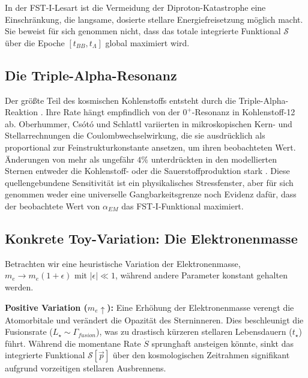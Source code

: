 \documentclass[12pt,a4paper]{article}
\theoremstyle{remark}
\begin{document}
In der FST-I-Lesart ist die Vermeidung der Diproton-Katastrophe eine Einschr\"ankung, die langsame, dosierte stellare Energiefreisetzung m\"oglich macht. Sie beweist f\"ur sich genommen nicht, dass das totale integrierte Funktional $\mathcal{S}$ \"uber die Epoche $[t_{BB}, t_\Lambda]$ global maximiert wird.

\subsection{Die Triple-Alpha-Resonanz}

Der gr\"o\ss{}te Teil des kosmischen Kohlenstoffs entsteht durch die Triple-Alpha-Reaktion \citep{Adams2019,Oberhummer2000}. Ihre Rate h\"angt empfindlich von der $0^+$-Resonanz in Kohlenstoff-12 ab. Oberhummer, Cs\'ot\'o und Schlattl variierten in mikroskopischen Kern- und Stellarrechnungen die Coulombwechselwirkung, die sie ausdr\"ucklich als proportional zur Feinstrukturkonstante ansetzen, um ihren beobachteten Wert. \"Anderungen von mehr als ungef\"ahr $4\%$ unterdr\"uckten in den modellierten Sternen entweder die Kohlenstoff- oder die Sauerstoffproduktion stark \citep{Oberhummer2000}. Diese quellengebundene Sensitivit\"at ist ein physikalisches Stressfenster, aber f\"ur sich genommen weder eine universelle Gangbarkeitsgrenze noch Evidenz daf\"ur, dass der beobachtete Wert von $\alpha_{EM}$ das FST-I-Funktional maximiert.

\subsection{Konkrete Toy-Variation: Die Elektronenmasse}

Betrachten wir eine heuristische Variation der Elektronenmasse, $m_e \to m_e(1+\epsilon)$ mit $|\epsilon| \ll 1$, w\"ahrend andere Parameter konstant gehalten werden.

\textbf{Positive Variation ($m_e \uparrow$):} Eine Erh\"ohung der Elektronenmasse verengt die Atomorbitale und ver\"andert die Opazit\"at des Sterninneren. Dies beschleunigt die Fusionsrate ($L_\star \sim \Gamma_{fusion}$), was zu drastisch k\"urzeren stellaren Lebensdauern ($t_\star$) f\"uhrt. W\"ahrend die momentane Rate $\dot{S}$ sprunghaft ansteigen k\"onnte, sinkt das integrierte Funktional $\mathcal{S}[\vec{p}]$ \"uber den kosmologischen Zeitrahmen signifikant aufgrund vorzeitigen stellaren Ausbrennens.
\end{document}
